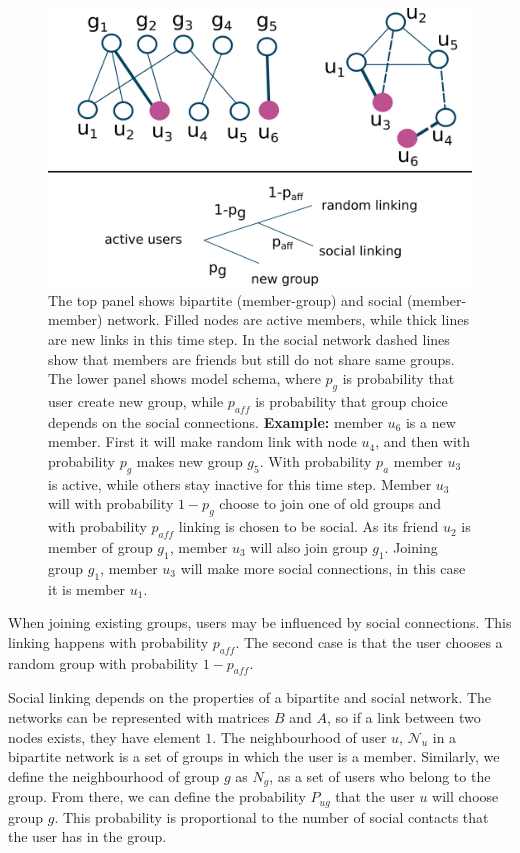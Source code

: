 \begin{figure}[h]
	\centering
	\includegraphics[scale=0.5]{Figures/figures/test.png}
	\caption{The top panel shows bipartite (member-group) and social (member-member) network. Filled nodes are active members, while thick lines are new links in this time step. In the social network dashed lines show that members are friends but still do not share same groups. The lower panel shows model schema, where $p_g$ is probability that user create new group, while $p_{aff}$ is probability that group choice depends on the social connections. \textbf{Example:} member $u_6$ is a new member. First it will make random link  with node $u_4$, and then with probability $p_g$ makes new group $g_5$. With probability $p_a$ member $u_3$ is active, while others stay inactive for this time step. Member $u_3$ will with probability $1-p_g$ choose to join one of old groups and with probability $p_{aff}$ linking is chosen to be social. As its friend $u_2$ is member of group $g_1$, member $u_3$ will also join group $g_1$. Joining group $g_1$, member $u_3$ will make more social connections, in this case it is member $u_1$.}
	\label{fig:schema}
\end{figure}

When joining existing groups, users may be influenced by social connections. This linking happens with probability $p_{aff}$. The second case is that the user chooses a random group with probability $1-p_{aff}$. 

Social linking depends on the properties of a bipartite and social network. The networks can be represented with matrices $B$ and $A$, so if a link between two nodes exists, they have element $1$. The neighbourhood of user $u$, $\mathcal{N}_{u}$ in a bipartite network is a set of groups in which the user is a member. Similarly, we define the neighbourhood of group $g$ as $N_g$, as a set of users who belong to the group. From there, we can define the probability $ P_{ug}$ that the user $u$ will choose group $g$. This probability is proportional to the number of social contacts that the user has in the group. 

